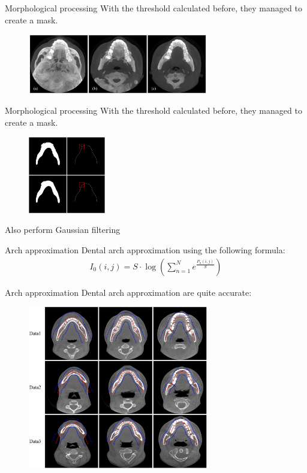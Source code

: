 \begin{frame}{\secname}{Morphological processing}
    With the threshold calculated before, they managed to create a mask.
    \begin{figure}
        \centering
        \includegraphics[width=0.7\textwidth]{img/dental_slices}
    \end{figure}
\end{frame}

\begin{frame}{\secname}{Morphological processing}
    With the threshold calculated before, they managed to create a mask.
    \begin{figure}
        \centering
        \includegraphics[width=0.3\textwidth]{img/dental_slice_thresh}
    \end{figure}
    Also perform Gaussian filtering
\end{frame}

\begin{frame}{\secname}{Arch approximation}
    Dental arch approximation using the following formula:
    \begin{gather*}
        I_0(i, j) = S \cdot \log \left( \sum_{n=1}^N e^{\frac{P_n(i,j)}{S}} \right)
    \end{gather*}
\end{frame}

\begin{frame}{\secname}{Arch approximation}
    Dental arch approximation are quite accurate:
    \begin{figure}
        \includegraphics[width=0.7\textwidth]{img/dental_arch.png}
    \end{figure}
\end{frame}


